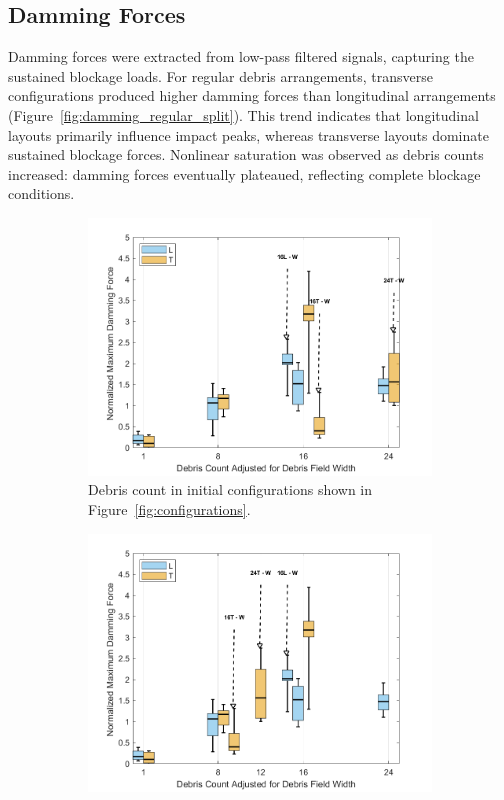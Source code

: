 \documentclass{article}
\begin{document}
\subsection{Damming Forces} 
Damming forces were extracted from low-pass filtered signals, capturing the sustained blockage loads. For regular debris arrangements, transverse configurations produced higher damming forces than longitudinal arrangements  (Figure~\ref{fig:damming_regular_split}). This trend indicates that longitudinal layouts primarily influence impact peaks, whereas transverse layouts dominate sustained blockage forces. Nonlinear saturation was observed as debris counts increased: damming forces eventually plateaued, reflecting complete blockage conditions.

\begin{figure}[htbp]
    \centering
    \begin{subfigure}[t]{0.9\textwidth}
        \centering
        \includegraphics[width=\textwidth]{Damming_Regular_SplitByTrial.png}
        \caption{Debris count in initial configurations shown in Figure~\ref{fig:configurations}.}
        \label{fig:damming_regular_original}
    \end{subfigure}
    \hfill
    \begin{subfigure}[t]{0.9\textwidth}
        \centering
        \includegraphics[width=\textwidth]{Damming_Regular_L_T_SplitByTrial_Remapped.png}

\end{subfigure}
\end{figure}
\end{document}
